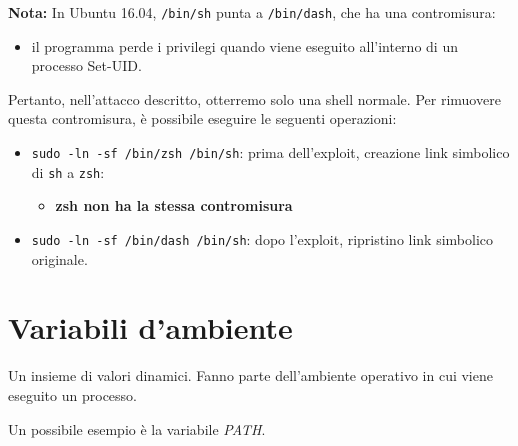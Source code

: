 \noindent \textbf{Nota:} In Ubuntu 16.04, \texttt{/bin/sh} punta a \texttt{/bin/dash}, che ha una contromisura: 
\begin{itemize}
    \item il programma perde i privilegi quando viene eseguito all'interno di un processo Set-UID. 
\end{itemize}
Pertanto, nell'attacco descritto, otterremo solo una shell normale. Per rimuovere questa contromisura, è possibile eseguire le seguenti operazioni:
\begin{itemize}
    \item \texttt{sudo -ln -sf /bin/zsh /bin/sh}: prima dell'exploit, creazione link simbolico di \texttt{sh} a \texttt{zsh}:
    \begin{itemize}
        \item \textbf{zsh non ha la stessa contromisura}
    \end{itemize}
    \item \texttt{sudo -ln -sf /bin/dash /bin/sh}: dopo l'exploit, ripristino link simbolico originale.
\end{itemize}

\section{Variabili d'ambiente}

Un insieme di valori dinamici. Fanno parte dell'ambiente operativo in cui viene eseguito un processo.

Un possibile esempio è la variabile \textit{PATH}.



